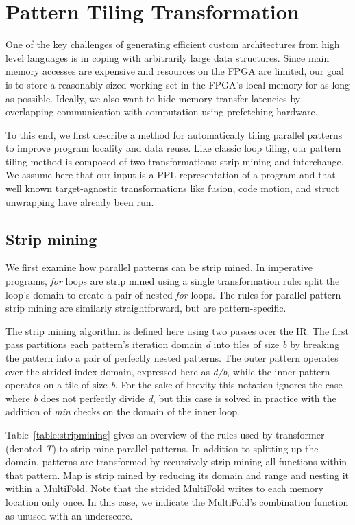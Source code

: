 \section{Pattern Tiling Transformation}
\label{transformations}

One of the key challenges of generating efficient custom architectures from
high level languages is in coping with arbitrarily large data structures.
Since main memory accesses are expensive and resources on the FPGA are limited,
our goal is to store a reasonably sized working set in the FPGA's local memory
for as long as possible. Ideally, we also want to hide memory transfer latencies
by overlapping communication with computation using prefetching hardware.

To this end, we first describe a method for automatically tiling parallel
patterns to improve program locality and data reuse.
Like classic loop tiling, our pattern tiling method is composed of two
transformations: strip mining and interchange.
We assume here that our input is a PPL representation of a program and that
well known target-agnostic transformations like fusion, code motion, and struct
unwrapping have already been run.



\subsection{Strip mining}
We first examine how parallel patterns can be strip mined.
In imperative programs, \emph{for} loops are strip mined using a single transformation
rule: split the loop's domain to create a pair of nested \emph{for} loops.
The rules for parallel pattern strip mining are similarly straightforward,
but are pattern-specific.

The strip mining algorithm is defined here using two passes over the IR.
The first pass partitions each pattern's iteration domain \emph{d} into tiles of
size \emph{b} by breaking the pattern into a pair of perfectly nested patterns.
The outer pattern operates over the strided index domain, expressed here as
\emph{d/b}, while the inner pattern operates on a tile of size \emph{b}.
For the sake of brevity this notation ignores the case where \emph{b} does not
perfectly divide \emph{d}, but this case is solved in practice with the
addition of \emph{min} checks on the domain of the inner loop.

Table~\ref{table:stripmining} gives an overview of the rules used by transformer
(denoted \emph{T}) to strip mine parallel patterns.
In addition to splitting up the domain, patterns are transformed by recursively
strip mining all functions within that pattern.
Map is strip mined by reducing its domain and range and nesting it within a MultiFold.
Note that the strided MultiFold writes to each memory location only once.
In this case, we indicate the MultiFold's combination function as unused with an underscore.

